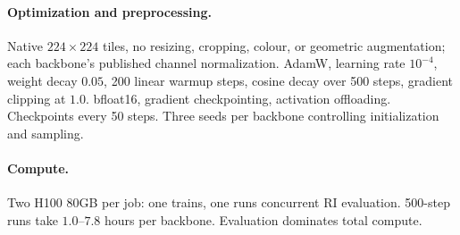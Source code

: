 \paragraph{Optimization and preprocessing.}
Native $224\times224$ tiles, no resizing, cropping, colour, or geometric augmentation; each
backbone's published channel normalization. AdamW, learning rate $10^{-4}$, weight decay $0.05$,
200 linear warmup steps, cosine decay over 500 steps, gradient clipping at $1.0$. bfloat16, gradient checkpointing,
activation offloading. Checkpoints every 50 steps. Three seeds per backbone controlling
initialization and sampling.

\paragraph{Compute.}
Two H100 80GB per job: one trains, one runs concurrent RI evaluation. 500-step runs take
$1.0$--$7.8$ hours per backbone. Evaluation dominates total compute.
